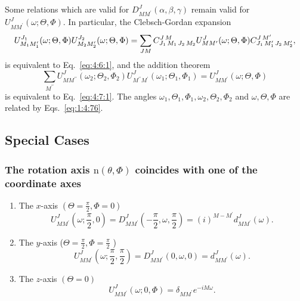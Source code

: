 Some relations which are valid for $D_{M M^{\prime}}^{J}(\alpha, \beta, \gamma)$ remain valid for $U_{M M^{\prime}}^{J}(\omega ; \Theta, \Phi)$. In particular, the Clebsch-Gordan expansion
\begin{equation}
U_{M_{1} M_{1}^{\prime}}^{J_{1}}(\omega ; \Theta, \Phi) U_{M_{2} M_{2}^{\prime}}^{J_{2}}(\omega ; \Theta, \Phi)=\sum_{J M} C_{J_{1}\,M_{1}\,J_{2}\,M_{2}}^{J\,M} U_{M M^{\prime}}^{J}(\omega ; \Theta, \Phi) C_{J_{1}\,M_{1}^{\prime}\,J_{2}\,M_{2}^{\prime}}^{J\,M^{\prime}} ,\label{eq:4:5:26}
\end{equation}
is equivalent to Eq.~\eqref{eq:4:6:1}, and the addition theorem
\begin{equation}
\sum_{M^{\prime \prime}} U_{M M^{\prime \prime}}^{J}\left(\omega_{2} ; \Theta_{2}, \Phi_{2}\right) U_{M^{\prime \prime} M^{\prime}}^{J}\left(\omega_{1} ; \Theta_{1}, \Phi_{1}\right)=U_{M M^{\prime}}^{J}(\omega ; \Theta, \Phi) \label{eq:4:5:27}
\end{equation}
is equivalent to Eq.~\eqref{eq:4:7:1}. The angles $\omega_{1}, \Theta_{1}, \Phi_{1}, \omega_{2}, \Theta_{2}, \Phi_{2}$ and $\omega, \Theta, \Phi$ are related by Eqs.~\eqref{eq:1:4:76}.

\subsection{Special Cases}\label{sec:4.5.6}
\subsubsection{ The rotation axis $\mathrm{n}(\theta, \Phi)$ coincides with one of the coordinate axes}
\begin{enumerate}[label=(\roman*)]
\item The $x$-axis $\left(\Theta=\frac{\pi}{2}, \Phi=0\right)$
\begin{equation}
U_{M M^{\prime}}^{J}\left(\omega ; \frac{\pi}{2}, 0\right)=D_{M M^{\prime}}^{J}\left(-\frac{\pi}{2}, \omega,\frac{\pi}{2}\right)=(i)^{M-M^{\prime}} d_{M M^{\prime}}^{J}(\omega). \label{eq:4:5:28}
\end{equation}
\item The $y$-axis ($\Theta=\frac{\pi}{2}, \Phi=\frac{\pi}{2}$ )
\begin{equation}
U_{M M^{\prime}}^{J}\left(\omega ; \frac{\pi}{2}, \frac{\pi}{2}\right)=D_{M M^{\prime}}^{J}(0, \omega, 0)=d_{M M^{\prime}}^{J}(\omega) .\label{eq:4:5:29}
\end{equation}
\item The $z$-axis $(\Theta=0)$
\begin{equation}
U_{M M^{\prime}}^{J}(\omega ; 0, \Phi)=\delta_{M M^{\prime}} e^{-i M \omega}. \label{eq:4:5:30}
\end{equation}
\end{enumerate}
